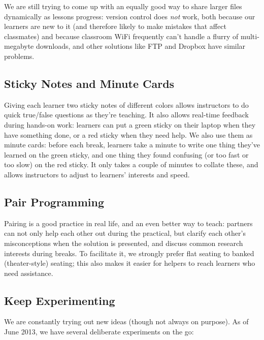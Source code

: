 \documentclass[10pt,a4paper,twocolumn]{article}
\begin{document}
We are still trying to come up with an equally good way to share larger
files dynamically as lessons progress: version control does \emph{not}
work, both because our learners are new to it (and therefore likely to
make mistakes that affect classmates) and because classroom WiFi
frequently can't handle a flurry of multi-megabyte downloads, and other
solutions like FTP and Dropbox have similar problems.

\subsection*{Sticky Notes and Minute Cards}

Giving each learner two sticky notes of different colors allows
instructors to do quick true/false questions as they're teaching. It
also allows real-time feedback during hands-on work: learners can put a
green sticky on their laptop when they have something done, or a red
sticky when they need help. We also use them as minute cards: before
each break, learners take a minute to write one thing they've learned on
the green sticky, and one thing they found confusing (or too fast or too
slow) on the red sticky. It only takes a couple of minutes to collate
these, and allows instructors to adjust to learners' interests and
speed.

\subsection*{Pair Programming}

Pairing is a good practice in real life, and an even better way to
teach: partners can not only help each other out during the practical,
but clarify each other's misconceptions when the solution is presented,
and discuss common research interests during breaks. To facilitate it,
we strongly prefer flat seating to banked (theater-style) seating; this
also makes it easier for helpers to reach learners who need assistance.

\subsection*{Keep Experimenting}

We are constantly trying out new ideas (though not always on purpose).
As of June 2013, we have several deliberate experiments on the go:
\end{document}
